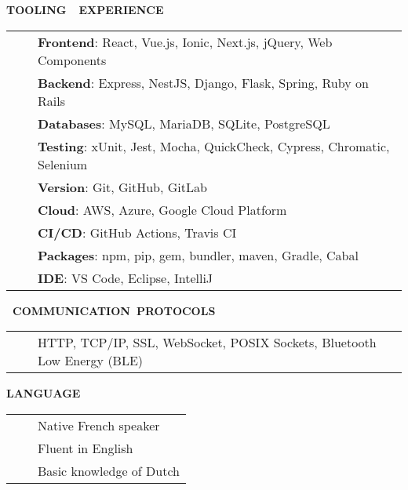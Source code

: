 \documentclass[a4paper,11pt,english]{article}
\newcommand{\LeftColumn}[0]{6.0cm}
\newcommand{\ToolCategory}[1]{\textbf{#1}}
\newcommand{\Bullet}[0]{\faCaretRight~~}
\newcommand{\Rubric}[1]{\colorbox{gray!20}{\parbox{\linewidth}{\centering\sffamily\bfseries{}#1}}}
\begin{document}
\begin{minipage}[t]{\LeftColumn}

\Rubric{\faTools \quad TOOLING~~EXPERIENCE}\vspace{8pt}

\begin{tabularx}{\linewidth}{@{}l@{}>{\raggedright\arraybackslash}X@{}}
\Bullet & \ToolCategory{Frontend}: React, Vue.js, Ionic, Next.js, jQuery, Web Components \\[0pt]
\Bullet & \ToolCategory{Backend}: Express, NestJS, Django, Flask, Spring, Ruby on Rails \\[0pt]
\Bullet & \ToolCategory{Databases}: MySQL, MariaDB, SQLite, PostgreSQL \\[0pt]
\Bullet & \ToolCategory{Testing}: xUnit, Jest, Mocha, QuickCheck, Cypress, Chromatic, Selenium \\[0pt]
\Bullet & \ToolCategory{Version}: Git, GitHub, GitLab \\[0pt]
\Bullet & \ToolCategory{Cloud}: AWS, Azure, Google Cloud Platform \\[0pt]
\Bullet & \ToolCategory{CI/CD}:  GitHub Actions, Travis CI \\[0pt]
\Bullet & \ToolCategory{Packages}: npm, pip, gem, bundler, maven, Gradle, Cabal \\[0pt]
\Bullet & \ToolCategory{IDE}: VS Code, Eclipse, IntelliJ \\[0pt]
\end{tabularx}

\vspace{12pt}\Rubric{\faNetworkWired~COMMUNICATION~PROTOCOLS}\vspace{8pt}

\begin{tabularx}{\linewidth}{@{}l@{}>{\raggedright\arraybackslash}X@{}}
\Bullet & HTTP, TCP/IP, SSL, WebSocket, POSIX Sockets, Bluetooth Low Energy (BLE) \\[0pt]
\end{tabularx}

\vspace{12pt}\Rubric{\faLanguage \quad LANGUAGE}\vspace{8pt}

\begin{tabularx}{\linewidth}{@{}l@{}l@{}}
\Bullet & Native French speaker \\[0pt]
\Bullet & Fluent in English \\[0pt]
\Bullet & Basic knowledge of Dutch \\[0pt]
\end{tabularx}


\end{minipage}
\end{document}
